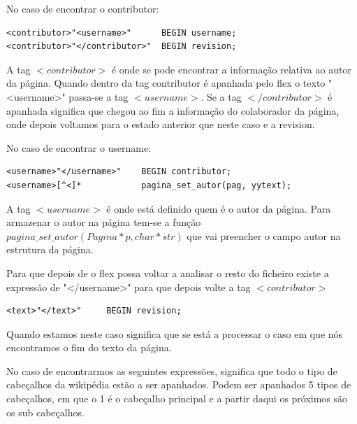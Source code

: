 \documentclass[11pt, a4paper, oneside]{article}
\begin{document}
No caso de encontrar o contributor:
\begin{verbatim}
<contributor>"<username>"      BEGIN username;
<contributor>"</contributor>"  BEGIN revision;

\end{verbatim}
A tag \begin{math}<contributor>\end{math} é onde se pode encontrar a informação relativa ao autor da página. 
Quando dentro da tag contributor é apanhada pelo flex o texto "<username>" passa-se a tag  \begin{math}<username>\end{math}.
Se a tag \begin{math}</contributor>\end{math} é apanhada significa que chegou ao fim a informação do colaborador da página, onde depois voltamos para o estado anterior que neste caso e a revision. 

No caso de encontrar o  username:
\begin{verbatim}
<username>"</username>"    BEGIN contributor;
<username>[^<]*            pagina_set_autor(pag, yytext);
\end{verbatim}


A tag \begin{math}<username>\end{math} é onde está definido quem é o autor da página. Para armazenar o autor na página tem-se a função\begin{math}pagina\_set\_autor(Pagina* p, char* str)\end{math} que vai preencher o campo autor na estrutura da página.


Para que depois de o flex possa voltar a analisar o resto do ficheiro existe a expressão de "</username>" para que depois volte a tag \begin{math}<contributor>\end{math}

\begin{verbatim}
<text>"</text>"     BEGIN revision;
\end{verbatim}

Quando estamos neste caso significa que se está a processar o caso em que nós encontramos o fim do texto da página.


No caso de encontrarmos as seguintes expressões, significa que todo o tipo de cabeçalhos da wikipédia estão a ser apanhados. Podem ser apanhados 5 tipos de cabeçalhos, em que o 1 é o cabeçalho principal e a partir daqui os próximos são os sub cabeçalhos.
\end{document}
